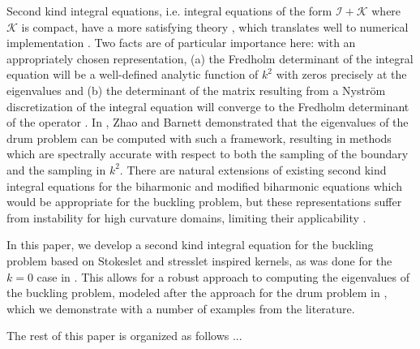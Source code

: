 Second kind integral equations, i.e. integral equations
of the form $\mathcal{I} + \mathcal{K}$ where $\mathcal{K}$
is compact, have a more satisfying theory
\cite{reed1972methods,kress1989linear},
which translates well to numerical implementation
\cite{atkinson2009numerical,bornemann2010numerical,
  hackbusch2012integral,zhao2015robust}. Two facts are
of particular importance here: with an appropriately
chosen representation, (a) the Fredholm determinant of the
integral equation will be a well-defined analytic function
of $k^2$ with zeros precisely at the eigenvalues and (b) the 
determinant of the matrix resulting from
a Nystr\"{o}m discretization of the integral equation
will converge to the Fredholm determinant of the operator
\cite{bornemann2010numerical}.
In \cite{zhao2015robust}, Zhao and Barnett demonstrated
that the eigenvalues of the drum problem can be
computed with such a framework, resulting in
methods which are spectrally accurate with respect
to both the sampling of the boundary and the sampling
in $k^2$. There are natural extensions of existing second
kind integral
equations for the biharmonic \cite{farkas1989mathematical}
and modified biharmonic \cite{jiang2013second} equations
which would be appropriate for the buckling problem, but
these representations suffer from instability for
high curvature domains, limiting their applicability
\cite{rachh2017integral}.

In this paper, we develop a second kind integral
equation for the buckling problem based on Stokeslet
and stresslet inspired kernels, as was done for the
$k=0$ case in \cite{rachh2017integral}. This allows
for a robust approach to computing the eigenvalues
of the buckling problem, modeled after the approach for
the drum problem in \cite{zhao2015robust}, which we
demonstrate with a number of examples from the
literature.

The rest of this paper is organized as follows ...

